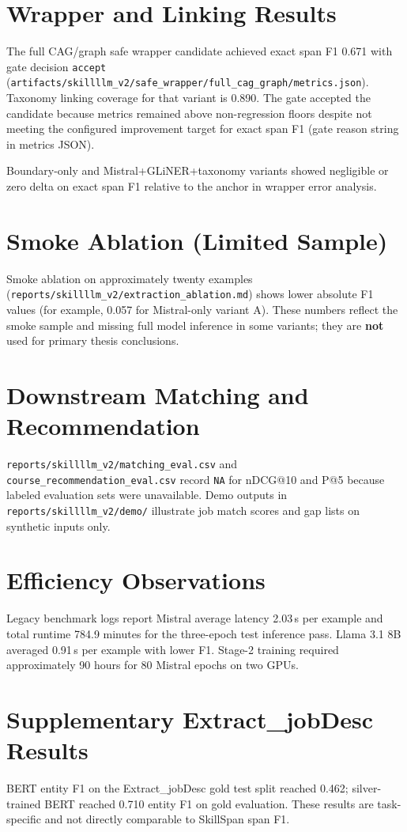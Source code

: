 \section{Wrapper and Linking Results}

The full CAG/graph safe wrapper candidate achieved exact span F1 0.671 with gate decision \texttt{accept} (\texttt{artifacts/skillllm\_v2/safe\_wrapper/full\_cag\_graph/metrics.json}).
Taxonomy linking coverage for that variant is 0.890.
The gate accepted the candidate because metrics remained above non-regression floors despite not meeting the configured improvement target for exact span F1 (gate reason string in metrics JSON).

Boundary-only and Mistral+GLiNER+taxonomy variants showed negligible or zero delta on exact span F1 relative to the anchor in wrapper error analysis.

\section{Smoke Ablation (Limited Sample)}

Smoke ablation on approximately twenty examples (\texttt{reports/skillllm\_v2/extraction\_ablation.md}) shows lower absolute F1 values (for example, 0.057 for Mistral-only variant A).
These numbers reflect the smoke sample and missing full model inference in some variants; they are \textbf{not} used for primary thesis conclusions.

\section{Downstream Matching and Recommendation}

\texttt{reports/skillllm\_v2/matching\_eval.csv} and \texttt{course\_recommendation\_eval.csv} record \texttt{NA} for nDCG@10 and P@5 because labeled evaluation sets were unavailable.
Demo outputs in \texttt{reports/skillllm\_v2/demo/} illustrate job match scores and gap lists on synthetic inputs only.

\section{Efficiency Observations}

Legacy benchmark logs report Mistral average latency 2.03\,s per example and total runtime 784.9 minutes for the three-epoch test inference pass.
Llama 3.1 8B averaged 0.91\,s per example with lower F1.
Stage-2 training required approximately 90 hours for 80 Mistral epochs on two GPUs.

\section{Supplementary Extract\_jobDesc Results}

BERT entity F1 on the Extract\_jobDesc gold test split reached 0.462; silver-trained BERT reached 0.710 entity F1 on gold evaluation.
These results are task-specific and not directly comparable to SkillSpan span F1.
